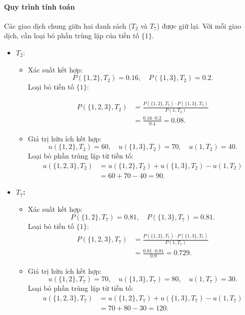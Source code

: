 \documentclass[conference]{IEEEtran}
\begin{document}
\paragraph{Quy trình tính toán}
Các giao dịch chung giữa hai danh sách (\(T_2\) và \(T_7\)) được giữ lại. Với mỗi giao dịch, cần loại bỏ phần trùng lặp của tiền tố \(\{1\}\).

\begin{itemize}
    \item \textbf{\(T_2\)}: 
    \begin{itemize}
        \item Xác suất kết hợp:  
        \[
        P(\{1,2\},T_2) = 0.16, \quad P(\{1,3\},T_2) = 0.2.
        \]
        Loại bỏ tiền tố \(\{1\}\):  

        \begin{align*}
        P(\{1,2,3\},T_2) &= \frac{P(\{1,2\},T_2) \cdot P(\{1,3\},T_2)}{P(1,T_2)} \\ 
                    &= \frac{0.16 \cdot 0.2}{0.4} = 0.08.
        \end{align*}


        \item Giá trị hữu ích kết hợp:  
        \[
        u(\{1,2\},T_2) = 60, \quad u(\{1,3\},T_2) = 70, \quad u(1,T_2) = 40.
        \]
        Loại bỏ phần trùng lặp từ tiền tố:  
        \begin{align*}
        u(\{1,2,3\},T_2) & = u(\{1,2\},T_2) + u(\{1,3\},T_2) - u(1,T_2) \\ 
                    &= 60 + 70 - 40 = 90.      
        \end{align*}
    \end{itemize}

    \item \textbf{\(T_7\):  }
    \begin{itemize}
        \item Xác suất kết hợp:  
        \[
        P(\{1,2\},T_7) = 0.81, \quad P(\{1,3\},T_7) = 0.81.
        \]
        Loại bỏ tiền tố \(\{1\}\):  
        \begin{align*}
        P(\{1,2,3\},T_7) &= \frac{P(\{1,2\},T_7) \cdot P(\{1,3\},T_7)}{P(1,T_7)} \\
                     &= \frac{0.81 \cdot 0.81}{0.9} = 0.729.
        \end{align*}

        \item Giá trị hữu ích kết hợp:  
        \[
        u(\{1,2\},T_7) = 70, \quad u(\{1,3\},T_7) = 80, \quad u(1,T_7) = 30.
        \]
        Loại bỏ phần trùng lặp từ tiền tố:  
        \begin{align*}
        u(\{1,2,3\},T_7) &= u(\{1,2\},T_7) + u(\{1,3\},T_7) - u(1,T_7) \\ 
                    &= 70 + 80 - 30 = 120.
        \end{align*}

    \end{itemize}
\end{itemize}
\end{document}
